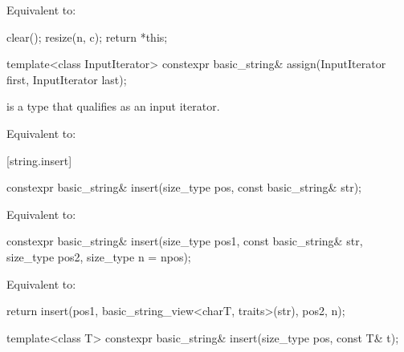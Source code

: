 \begin{itemdescr}
\pnum
\effects
Equivalent to:
\begin{codeblock}
clear();
resize(n, c);
return *this;
\end{codeblock}
\end{itemdescr}

%
\begin{itemdecl}
template<class InputIterator>
  constexpr basic_string& assign(InputIterator first, InputIterator last);
\end{itemdecl}

\begin{itemdescr}
\pnum
\constraints
{} is a type that qualifies as an input
iterator.

\pnum
\effects
Equivalent to: 
\end{itemdescr}

[string.insert]{}

%
\begin{itemdecl}
constexpr basic_string& insert(size_type pos, const basic_string& str);
\end{itemdecl}

\begin{itemdescr}
\pnum
\effects
Equivalent to: 
\end{itemdescr}

%
\begin{itemdecl}
constexpr basic_string& insert(size_type pos1, const basic_string& str,
                               size_type pos2, size_type n = npos);
\end{itemdecl}

\begin{itemdescr}
\pnum
\effects
Equivalent to:
\begin{codeblock}
return insert(pos1, basic_string_view<charT, traits>(str), pos2, n);
\end{codeblock}
\end{itemdescr}

%
\begin{itemdecl}
template<class T>
  constexpr basic_string& insert(size_type pos, const T& t);
\end{itemdecl}

